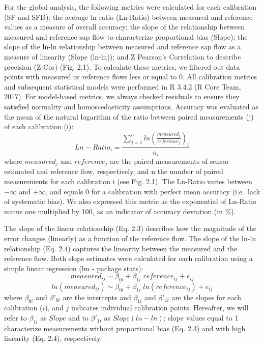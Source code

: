 \documentclass[11pt,twoside]{reedthesis}
\begin{document}
For the global analysis, the following metrics were calculated for each
calibration (SF and SFD): the average ln ratio (Ln-Ratio) between
measured and reference values as a measure of overall accuracy; the
slope of the relationship between measured and reference sap flow to
characterize proportional bias (Slope); the slope of the ln-ln
relationship between measured and reference sap flow as a measure of
linearity (Slope (ln-ln)); and Z Pearson's Correlation to describe
precision (Z-Cor) (Fig. 2.1). To calculate these metrics, we filtered
out data points with measured or reference flows less or equal to 0. All
calibration metrics and subsequent statistical models were performed in
R 3.4.2 (R Core Team, 2017). For model-based metrics, we always checked
residuals to ensure they satisfied normality and homoscedasticity
assumptions. Accuracy was evaluated as the mean of the natural logarithm
of the ratio between paired measurements (j) of each calibration (i):
\begin{equation}
Ln-Ratio_i = \frac{\sum_{j=1}^{n} ln(\frac{measured_j}{reference_j})_i}{n_i}
\end{equation}
where \(measured_j\) and \(reference_j\) are the paired measurements of
sensor-estimated and reference flow, respectively, and n the number of
paired measurements for each calibration i (see Fig. 2.1). The Ln-Ratio
varies between \(-\infty\) and \(+\infty\), and equals 0 for a
calibration with perfect mean accuracy (i.e.~lack of systematic bias).
We also expressed this metric as the exponential of Ln-Ratio minus one
multiplied by 100, as an indicator of accuracy deviation (in \%).\par

The slope of the linear relationship (Eq. 2.3) describes how the
magnitude of the error changes (linearly) as a function of the reference
flow. The slope of the ln-ln relationship (Eq. 2.4) captures the
linearity between the measured and the reference flow. Both slope
estimates were calculated for each calibration using a simple linear
regression (lm - package stats):
\begin{equation}
measured_{ij} \sim \beta_{0i}+\beta_{1i}\;reference_{ij}+e_{ij}
\end{equation}
\begin{equation}
ln(measured_{ij}) \sim \beta^{\prime}_{0i}+\beta^{\prime}_{1i}\;ln(reference_{ij}) +e_{ij}
\end{equation}
where \(\beta_{0i}\) and \(\beta'_{0i}\) are the intercepts and
\(\beta_{1i}\) and \(\beta'_{1i}\) are the slopes for each calibration
(\(i\)), and \(j\) indicates individual calibration points. Hereafter,
we will refer to \(\beta_{1i}\) as \(Slope\) and to \(\beta'_{1i}\) as
\(Slope (ln-ln)\); slope values equal to 1 characterize measurements
without proportional bias (Eq. 2.3) and with high linearity (Eq. 2.4),
respectively.\par
\end{document}
